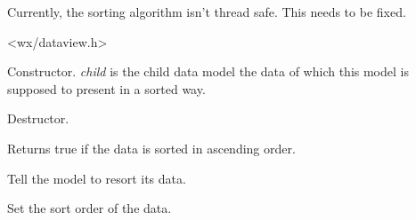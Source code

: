 Currently, the sorting algorithm isn't thread safe. This needs
to be fixed.




<wx/dataview.h>

\label{wxdataviewsortedlistmodelwxdataviewsortedlistmodel}


Constructor. {\it child} is the child data model the data of
which this model is supposed to present in a sorted way.

\label{wxdataviewsortedlistmodeldtor}


Destructor.

\label{wxdataviewsortedlistmodelgetascending}


Returns true if the data is sorted in ascending order.

\label{wxdataviewsortedlistmodelresort}


Tell the model to resort its data.

\label{wxdataviewsortedlistmodelsetascending}


Set the sort order of the data.


